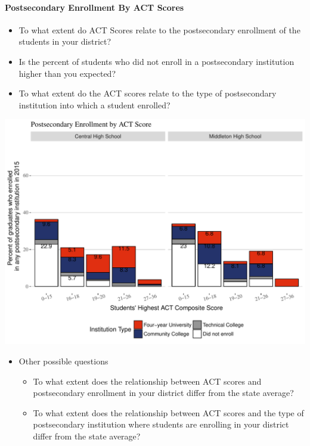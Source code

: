 \documentclass[11pt,]{article}
\providecommand{\tightlist}{%
  \setlength{\itemsep}{0pt}\setlength{\parskip}{0pt}}
\let\oldparagraph\paragraph
\renewcommand{\paragraph}[1]{\oldparagraph{#1}\mbox{}}
\begin{document}
\newpage

\paragraph{Postsecondary Enrollment By ACT
Scores}\label{postsecondary-enrollment-by-act-scores}

\begin{itemize}
\tightlist
\item
  To what extent do ACT Scores relate to the postsecondary enrollment of
  the students in your district?\\
\item
  Is the percent of students who did not enroll in a postsecondary
  institution higher than you expected?
\item
  To what extent do the ACT scores relate to the type of postsecondary
  institution into which a student enrolled?
\end{itemize}

\includegraphics{20170411_PSWRR_no_CTE_files/figure-latex/Figure7a-1.pdf}

\begin{itemize}
\tightlist
\item
  Other possible questions

  \begin{itemize}
  \tightlist
  \item
    To what extent does the relationship between ACT scores and
    postsecondary enrollment in your district differ from the state
    average?
  \item
    To what extent does the relationship between ACT scores and the type
    of postsecondary institution where students are enrolling in your
    district differ from the state average?
  \end{itemize}
\end{itemize}
\end{document}
